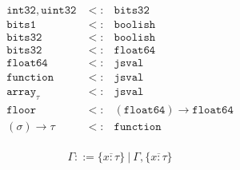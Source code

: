 \documentclass{article}
\newcommand{\funty}[2]{({#1}) \rightarrow {#2}}
\newcommand{\seq}[1]{\overline{{#1}}}
\newcommand\defeq{\stackrel{\mbox{\tiny def}}{=}}
\newcommand{\boolean}{\mathtt{bits1}}
\newcommand{\uintone}{\mathtt{uint8}}
\newcommand{\uinttwo}{\mathtt{uint16}}
\newcommand{\uintfour}{\mathtt{uint32}}
\newcommand{\intone}{\mathtt{int8}}
\newcommand{\inttwo}{\mathtt{int16}}
\newcommand{\intfour}{\mathtt{int32}}
\newcommand{\float}{\mathtt{float32}}
\newcommand{\double}{\mathtt{float64}}
\newcommand{\arr}[1]{\mathtt{array}_{#1}}
\newcommand{\any}{\mathtt{jsval}}
\newcommand{\undef}{\mathtt{undefined}}
\newcommand{\nul}{\mathtt{null}}
\newcommand{\num}{\mathtt{number}}
\newcommand{\obj}{\mathtt{object}}
\newcommand{\word}{\mathtt{bits32}}
\newcommand{\function}{\mathtt{function}}
\newcommand{\union}[2]{{#1}\mathrel{|}{#2}}
\newcommand{\boolish}{\mathtt{boolish}}
\newcommand{\floor}{\mathtt{floor}}
\begin{document}
\[
\begin{array}{rcl}
\intfour, \uintfour  & <: & \word \\
\boolean             & <: & \boolish \\
\word                & <: & \boolish \\
\word                & <: & \double \\
\double              & <: & \any \\
\function            & <: & \any \\
\arr{\tau}           & <: & \any \\
\floor               & <: & \funty{\double}{\double} \\
\funty{\sigma}{\tau} & <: & \function \\
\end{array}
\]



\[
\Gamma ::= \{ \seq{x : \tau} \} ~|~ \Gamma, \{ \seq{x : \tau} \}
\]
\end{document}
